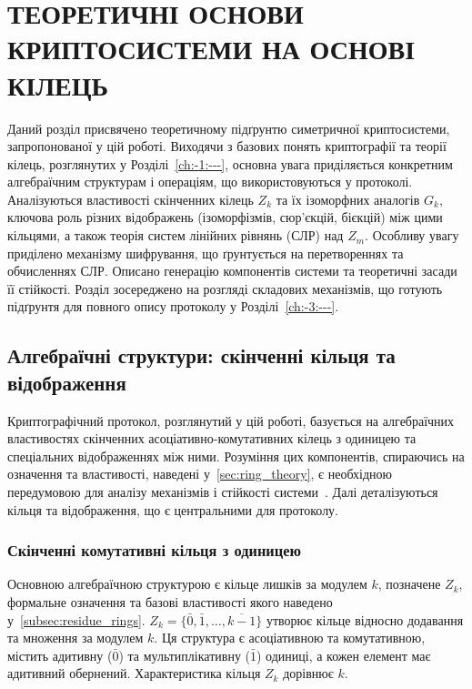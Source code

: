 \chapter{ТЕОРЕТИЧНІ ОСНОВИ КРИПТОСИСТЕМИ НА ОСНОВІ КІЛЕЦЬ}\label{ch:-2:------}

Даний розділ присвячено теоретичному підґрунтю симетричної криптосистеми, запропонованої у цій роботі.
Виходячи з базових понять криптографії та теорії кілець, розглянутих у Розділі~\ref{ch:-1:---}, основна увага приділяється конкретним алгебраїчним структурам і операціям, що використовуються у протоколі.
Аналізуються властивості скінченних кілець $Z_k$ та їх ізоморфних аналогів $G_k$, ключова роль різних відображень (ізоморфізмів, сюр'єкцій, бієкцій) між цими кільцями, а також теорія систем лінійних рівнянь (СЛР) над $Z_m$.
Особливу увагу приділено механізму шифрування, що ґрунтується на перетвореннях та обчисленнях СЛР.
Описано генерацію компонентів системи та теоретичні засади її стійкості.
Розділ зосереджено на розгляді складових механізмів, що готують підґрунтя для повного опису протоколу у Розділі~\ref{ch:-3:---}.

\section{Алгебраїчні структури: скінченні кільця та відображення}
\label{sec:algebraic_structures}
Криптографічний протокол, розглянутий у цій роботі, базується на алгебраїчних властивостях скінченних асоціативно-комутативних кілець з одиницею та спеціальних відображеннях між ними.
Розуміння цих компонентів, спираючись на означення та властивості, наведені у~\ref{sec:ring_theory}, є необхідною передумовою для аналізу механізмів і стійкості системи~\cite{Shoup08, KatzLindell14}.
Далі деталізуються кільця та відображення, що є центральними для протоколу.

\subsection{Скінченні комутативні кільця з одиницею}
\label{subsec:finite_rings}
Основною алгебраїчною структурою є кільце лишків за модулем $k$, позначене $Z_k$, формальне означення та базові властивості якого наведено у~\ref{subsec:residue_rings}.
$Z_k = \{\bar{0}, \bar{1}, \ldots, \overline{k-1}\}$ утворює кільце відносно додавання та множення за модулем $k$.
Ця структура є асоціативною та комутативною, містить адитивну ($\bar{0}$) та мультиплікативну ($\bar{1}$) одиниці, а кожен елемент має адитивний обернений.
Характеристика кільця $Z_k$ дорівнює $k$.

